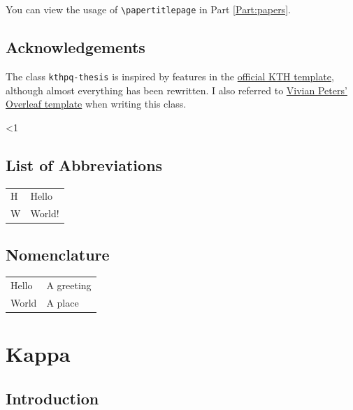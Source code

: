 \documentclass[figtreepath=kthpq/fonts/Figtree/]{kthpq-thesis}
\newcounter{lipsumpar}
\newcommand{\nextlipsum}[1]{%
  \ifnum#1<1%
  \else%
    \edef\oldlipsumpar{\thelipsumpar}%
    \addtocounter{lipsumpar}{#1}%
    \addtocounter{lipsumpar}{-1}%
    \lipsum[\oldlipsumpar-\thelipsumpar]%
    \stepcounter{lipsumpar}%
  \fi%
}
\begin{document}



You can view the usage of \verb|\papertitlepage| in Part \ref{Part:papers}.

\chapter{Acknowledgements}

The class \texttt{kthpq-thesis} is inspired by features in the \href{https://www.kth.se/en/student/studier/examensarbete/avhandlingarochexamensarbeten/mall-for-avhandling-1.458236}{official KTH template}, although almost everything has been rewritten. I also referred to \href{https://www.overleaf.com/latex/templates/kth-phd-thesis-template-2024/kzrmpmhymhxq}{Vivian Peters' Overleaf template} when writing this class.

\nextlipsum{2}

\tableofcontents

\listoffigures

\listoftables

\chapter{List of Abbreviations}

\noindent\begin{tabular}{ll}
  H & Hello \\
  W & World!
\end{tabular}

\chapter{Nomenclature}

\noindent\begin{tabular}{ll}
  Hello & A greeting \\
  World & A place
\end{tabular}


\mainmatter
\newrefsection %

\part{Kappa}

\chapter{Introduction}
\end{document}
